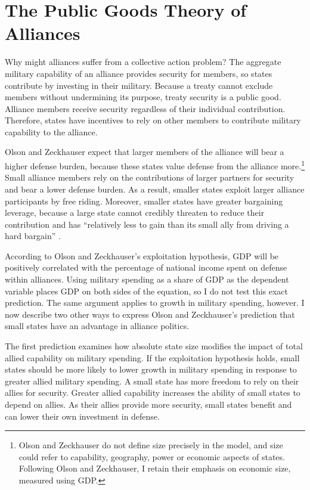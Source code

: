 \documentclass[12pt]{article}
\begin{document}
\section{The Public Goods Theory of Alliances}


Why might alliances suffer from a collective action problem? 
The aggregate military capability of an alliance provides security for members, so states contribute by investing in their military.
Because a treaty cannot exclude members without undermining its purpose, treaty security is a public good. 
Alliance members receive security regardless of their individual contribution. 
Therefore, states have incentives to rely on other members to contribute military capability to the alliance. 

 
Olson and Zeckhauser expect that larger members of the alliance will bear a higher defense burden, because these states value defense from the alliance more.\footnote{Olson and Zeckhauser do not define size precisely in the model, and size could refer to capability, geography, power or economic aspects of states. Following Olson and Zeckhauser, I retain their emphasis on economic size, measured using GDP.}
Small alliance members rely on the contributions of larger partners for security and bear a lower defense burden.
As a result, smaller states exploit larger alliance participants by free riding. 
Moreover, smaller states have greater bargaining leverage, because a large state cannot credibly threaten to reduce their contribution and has ``relatively less to gain than its small ally from driving a hard bargain'' \citep[pg. 274]{OlsonZeckhauser1966}. 


According to Olson and Zeckhauser's exploitation hypothesis, GDP will be positively correlated with the percentage of national income spent on defense within alliances.
Using military spending as a share of GDP as the dependent variable places GDP on both sides of the equation, so I do not test this exact prediction. 
The same argument applies to growth in military spending, however. 
I now describe two other ways to express Olson and Zeckhauser's prediction that small states have an advantage in alliance politics. 


The first prediction examines how absolute state size modifies the impact of total allied capability on military spending. 
If the exploitation hypothesis holds, small states should be more likely to lower growth in military spending in response to greater allied military spending. 
A small state has more freedom to rely on their allies for security. 
Greater allied capability increases the ability of small states to depend on allies. 
As their allies provide more security, small states benefit and can lower their own investment in defense. 
\end{document}

